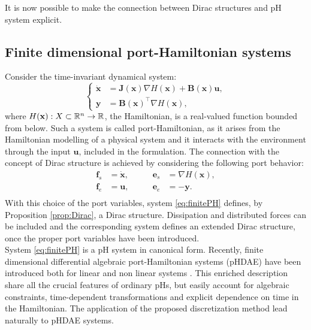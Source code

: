 It is now possible to make the connection between Dirac structures and pH system explicit.

\subsection{Finite dimensional port-Hamiltonian systems}
 Consider the time-invariant dynamical system:
\begin{equation}
\label{eq:finitePH}
\begin{cases}
\dot{ \mathbf{x} } &= \mathbf{J}(\mathbf{x}) \nabla H(\mathbf{x}) + \mathbf{B}(\mathbf{x})\mathbf{u}, \\
\mathbf{y} &= \mathbf{B}(\mathbf{x})^\top \nabla H(\mathbf{x}),
\end{cases}
\end{equation}
where $ H(\mathbf{x}) : X \subset \mathbb{R}^n \rightarrow \mathbb{R} $, the Hamiltonian, is a real-valued function bounded from below. Such a system is called port-Hamiltonian, as it arises from the Hamiltonian modelling of a physical system and it interacts with the environment through the input $\mathbf{u}$, included in the formulation. The connection with the concept of Dirac structure is achieved by considering the following port behavior:
\begin{equation}
\begin{aligned}
\mathbf{f}_s &= \dot{\mathbf{x}}, \qquad 
&\mathbf{e}_s &= \nabla{H}(\mathbf{x}), \\
\mathbf{f}_e &=\mathbf{u}, \qquad
&\mathbf{e}_e &= -\mathbf{y}. \\
\end{aligned}
\end{equation}
With this choice of the port variables, system \eqref{eq:finitePH} defines, by Proposition \ref{prop:Dirac}, a Dirac structure. Dissipation and distributed forces can be included and the corresponding system defines an extended Dirac structure, once the proper port variables have been introduced. \\

System \ref{eq:finitePH} is a pH system in canonical form. Recently, finite dimensional differential algebraic port-Hamiltonian systems (pHDAE) have been introduced both for linear \cite{beattie2018linear} and non linear systems \cite{morandin2019}. This enriched description share all the crucial features of ordinary pHs, but easily account for algebraic constraints, time-dependent transformations and explicit dependence on time in the Hamiltonian. The application of the proposed discretization method lead naturally to pHDAE systems. 


